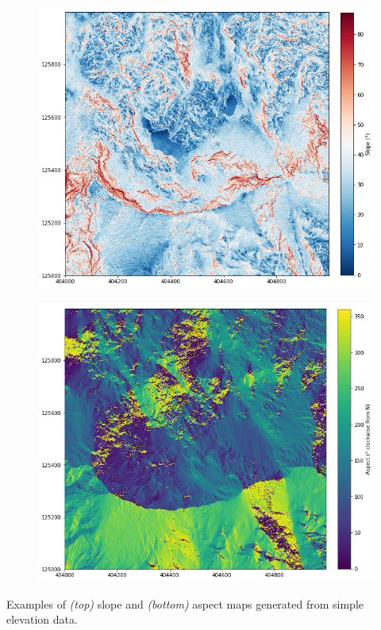 \begin{pagemap}
\centering
\begin{subfigure}{0.76\linewidth}
\includegraphics[width = \textwidth]{images/maps/slopemap.png}
\subcaption{ } \label{slope}
\end{subfigure}

\begin{subfigure}{0.76\linewidth}
\includegraphics[width = \textwidth]{images/maps/aspectmap.png}
\subcaption{ } \label{aspect}
\end{subfigure}

\caption[Slope and Aspect maps]{Examples of  \emph{(top)} slope and  \emph{(bottom)} aspect maps generated from simple elevation data. }
\end{pagemap}







